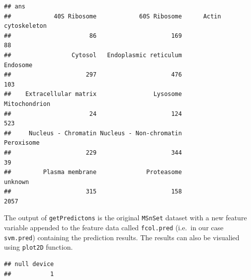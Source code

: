 \begin{Shaded}
\begin{Highlighting}[]
\StringTok{ }
                      \NormalTok{,}
                      \NormalTok{, }
                      \NormalTok{,}
                      
\end{Highlighting}
\end{Shaded}

\begin{verbatim}
## ans
##            40S Ribosome            60S Ribosome      Actin cytoskeleton 
##                      86                     169                      88 
##                 Cytosol   Endoplasmic reticulum                Endosome 
##                     297                     476                     103 
##    Extracellular matrix                Lysosome           Mitochondrion 
##                      24                     124                     523 
##     Nucleus - Chromatin Nucleus - Non-chromatin              Peroxisome 
##                     229                     344                      39 
##         Plasma membrane              Proteasome                 unknown 
##                     315                     158                    2057
\end{verbatim}

The output of \texttt{getPredictons} is the original \texttt{MSnSet}
dataset with a new feature variable appended to the feature data called
\texttt{fcol.pred} (i.e.~in our case \texttt{svm.pred}) containing the
prediction results. The results can also be visualied using
\texttt{plot2D} function.

\begin{Shaded}
\begin{Highlighting}[]
\NormalTok{()}
\end{Highlighting}
\end{Shaded}

\begin{verbatim}
## null device 
##           1
\end{verbatim}

\begin{Shaded}
\begin{Highlighting}[]
 \NormalTok{)}
\end{Highlighting}
\end{Shaded}


